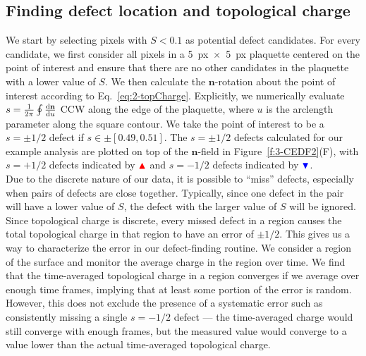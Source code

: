 \subsection{Finding defect location and topological charge}
We start by selecting pixels with $S < 0.1$ as potential defect candidates.
For every candidate, we first consider all pixels in a 5~px~$\times$~5~px plaquette centered on the point of interest and ensure that there are no other candidates in the plaquette with a lower value of $S$.
We then calculate the $\mathbf{n}$-rotation about the point of interest according to Eq.~\ref{eq:2-topCharge}.
Explicitly, we numerically evaluate $s = \frac{1}{2\pi} \oint \frac{\textup{d}\mathbf{n}}{\textup{d}u}$ CCW along the edge of the plaquette, where $u$ is the arclength parameter along the square contour.
We take the point of interest to be a $s = \pm 1/2$ defect if $s \in \pm [0.49,0.51]$.
The $s=\pm1/2$ defects calculated for our example analysis are plotted on top of the $\mathbf{n}$-field in Figure~\ref{f:3-CEDF2}(F), with $s = +1/2$ defects indicated by ${\color{red} \blacktriangle } $  and $s = -1/2$ defects indicated by ${ \color{blue} \blacktriangledown } $.\\

Due to the discrete nature of our data, it is possible to ``miss'' defects, especially when pairs of defects are close together.
Typically, since one defect in the pair will have a lower value of $S$, the defect with the larger value of $S$ will be ignored.
Since topological charge is discrete, every missed defect in a region causes the total topological charge in that region to have an error of $\pm 1/2$.
This gives us a way to characterize the error in our defect-finding routine.
We consider a region of the surface and monitor the average charge in the region over time.
We find that the time-averaged topological charge in a region converges if we average over enough time frames, implying that at least some portion of the error is random.
However, this does not exclude the presence of a systematic error such as consistently missing a single $s = -1/2$ defect --- the time-averaged charge would still converge with enough frames, but the measured value would converge to a value lower than the actual time-averaged topological charge.\\


